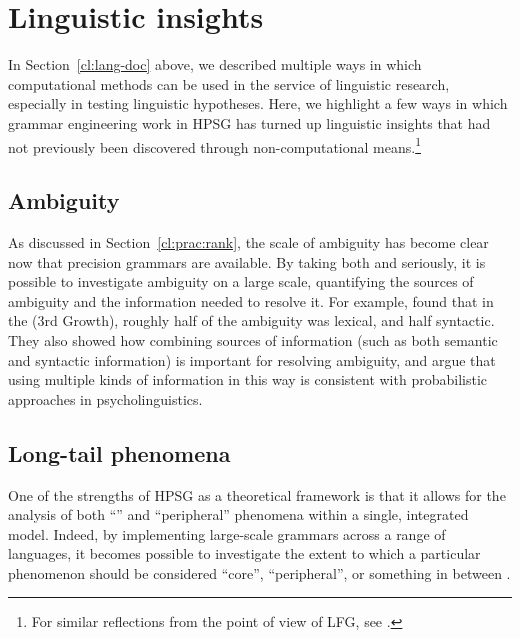 \documentclass[output=paper,nonflat]{langsci/langscibook}
\begin{document}

\section{Linguistic insights}
\label{cl:insight}

In Section~\ref{cl:lang-doc} above, we described multiple ways in which computational methods can be used in the service of linguistic research, especially in testing linguistic hypotheses. Here, we highlight a few ways in which grammar engineering work in HPSG has turned up linguistic insights that had not previously been discovered through non-computational means.\footnote{For similar reflections from the point of view of LFG, see \cite{King:16}.}

\subsection{Ambiguity} %

As discussed in Section~\ref{cl:prac:rank},
the scale of ambiguity has become clear now that  precision grammars are available.
By taking both  and  seriously,
it is possible to investigate ambiguity on a large scale,
quantifying the sources of ambiguity and the information needed to resolve it.
For example, \citet{Tou:Man:Shi:Fli:Oep:02,Tou:Man:Fli:Oep:05}
found that in the   (3rd Growth),
roughly half of the ambiguity was lexical, and half syntactic.
They also showed how combining sources of information
(such as both semantic and syntactic information)
is important for resolving ambiguity,
and argue that using multiple kinds of information in this way is consistent with probabilistic approaches in psycholinguistics.


\subsection{Long-tail phenomena} %

One of the strengths of HPSG as a theoretical framework is that it allows for
the analysis of both ``'' and ``peripheral'' phenomena within a single, integrated model.
Indeed, by implementing large-scale grammars across a range of languages,
it becomes possible to investigate the extent to which
a particular phenomenon should be considered ``core'', ``peripheral'',
or something in between \citep{MuellerKernigkeit}.
\end{document}
